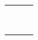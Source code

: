 \begin{tabular}{>{\bfseries}lll}
    & & \\
    & & \\
    & & \\
    & & \\
    & & \\ 
    & & \\
    & & \\
    & & \\
    
\end{tabular}
